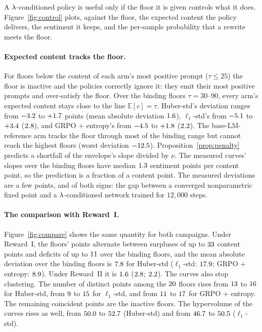 A $\lambda$-conditioned policy is useful only if the floor it is given controls
what it does. Figure~\ref{fig:control} plots, against the floor, the expected
content the policy delivers, the sentiment it keeps, and the per-sample
probability that a rewrite meets the floor.

\paragraph{Expected content tracks the floor.}
For floors below the content of each arm's most positive prompt ($\tau \le 25$)
the floor is inactive and the policies correctly ignore it: they emit their
most positive prompts and over-satisfy the floor. Over the binding floors
$\tau = 30$--$90$, every arm's expected content stays close to the line
$\mathbb{E}[c] = \tau$. Huber-std's deviation ranges from $-3.2$ to
$+1.7$ points (mean absolute deviation $1.6$), $\ell_1$-std's
from $-5.1$ to $+3.4$ ($2.8$), and GRPO + entropy's from
$-4.5$ to $+1.8$ ($2.2$). The base-LM-reference arm
tracks the floor through most of the binding range but cannot reach the highest
floors (worst deviation $-12.5$). Proposition~\ref{prop:penalty}
predicts a shortfall of the envelope's slope divided by $\nu$. The measured
curves' slopes over the binding floors have median $1.3$ sentiment
points per content point, so the prediction is a fraction of a content point.
The measured deviations are a few points, and of both signs: the gap between a
converged nonparametric fixed point and a $\lambda$-conditioned network trained for
$12{,}000$ steps.

\paragraph{The comparison with Reward~I.}
Figure~\ref{fig:compare} shows the same quantity for both campaigns. Under
Reward~I, the floors' points alternate between surpluses of up to $33$ content
points and deficits of up to $11$ over the binding floors, and the mean absolute deviation over the
binding floors is $7.8$ for Huber-std ($\ell_1$-std: $17.9$;
GRPO + entropy: $8.9$). Under Reward~II it is $1.6$
($2.8$; $2.2$). The curves also stop clustering. The number of
distinct points among the $20$ floors rises from $13$ to
$16$ for Huber-std, from $9$ to $15$ for
$\ell_1$-std, and from $11$ to $17$ for GRPO + entropy.
The remaining coincident points are the inactive floors. The hypervolume of the
\rrebel{} curves rises as well, from $50.0$ to $52.7$ (Huber-std) and
from $46.7$ to $50.5$ ($\ell_1$-std).


